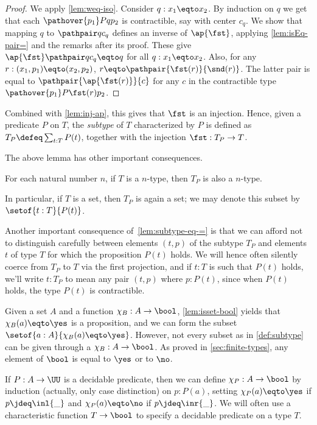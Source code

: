 \begin{proof}
We apply \cref{lem:weq-iso}. Consider $q: x_1 \eqto x_2$.
By induction on $q$ we get that each $\pathover {p_1} P q {p_2}$ is contractible,
say with center $c_q$. We show that
mapping $q$ to $\pathpair q {c_q}$ defines an inverse of $\ap{\fst}$,
applying \cref{lem:isEq-pair=} and the remarks after its proof.
These give $\ap{\fst}\pathpair q {c_q} \eqto q$ for all $q: x_1 \eqto x_2$.
Also, for any $r: (x_1,p_1) \eqto (x_2,p_2)$, $r \eqto \pathpair{\fst(r)}{\snd(r)}$.
The latter pair is equal to $\pathpair{\ap{\fst(r)}}{c}$ for any $c$
in the contractible type $\pathover {p_1} P {\fst(r)} {p_2}$.
\end{proof}
Combined with \cref{lem:inj-ap},
this gives that $\fst$ is an injection.
Hence, given a predicate $P$ on $T$,
the \emph{subtype} of $T$ characterized by $P$ is defined
as $T_P\defeq \sum_{t:T} P(t)$,
together with the injection $\fst : T_P \to T$.

The above lemma has other important consequences.
\begin{corollary}\label{cor:subtype-same-level}
  For each natural number $n$,
  if $T$ is a $n$-type, then $T_P$ is also a $n$-type.
\end{corollary}
In particular, if $T$ is a set, then $T_P$ is again a set;
we may denote this subset by $\setof{t:T}{P(t)}$.

\begin{remark}\label{rem:subtype-convention}
  Another important consequence of~\cref{lem:subtype-eq-=}
  is that we can afford not to distinguish carefully
  between elements $(t,p)$ of the subtype $T_P$
  and elements $t$ of type $T$ for which the proposition $P(t)$ holds.
  We will hence often silently coerce from $T_P$ to $T$ via the first projection,
  and if $t:T$ is such that $P(t)$ holds, we'll write $t:T_P$
  to mean any pair $(t,p)$ where $p:P(t)$,
  since when $P(t)$ holds, the type $P(t)$ is contractible.
\end{remark}
Given a set $A$ and a function $\chi_B: A\to\bool$,
\cref{lem:isset-bool} yields that $\chi_B(a) \eqto \yes$ is a
proposition, and we can form
the subset $\setof{a:A}{\chi_B(a) \eqto \yes}$. However,
not every subset as in \cref{def:subtype} can be given
through a $\chi_B: A\to\bool$. As proved in \cref{sec:finite-types},
any element of $\bool$ is equal to $\yes$ or to $\no$.

If $P: A\to\UU$ is a decidable predicate, then
we can define $\chi_P: A\to\bool$ by induction (actually,
only case distinction) on $p:P(a)$, setting $\chi_P(a) \eqto \yes$
if $p\jdeq\inl{\_}$ and $\chi_P(a) \eqto \no$ if $p\jdeq\inr{\_}$.
We will often use a characteristic function $T\to\bool$ to
specify a decidable predicate on a type $T$.

